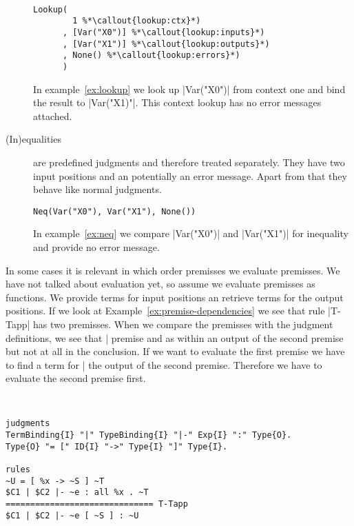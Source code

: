 \begin{description}
\begin{example}{~}
\begin{lstlisting}[language=sltc]
Lookup(
        1 %*\callout{lookup:ctx}*)
      , [Var("X0")] %*\callout{lookup:inputs}*)
      , [Var("X1")] %*\callout{lookup:outputs}*)
      , None() %*\callout{lookup:errors}*)
      )
\end{lstlisting}
\label{ex:lookup}
\end{example}

  In example~\ref{ex:lookup} we look up \code|Var("X0")| from
  context one and bind the result to \code|Var("X1)"|. This context
  lookup has no error messages attached.

\item[(In)equalities] are predefined judgments and therefore treated
  separately. They have two input positions and an potentially an
  error message. Apart from that they behave like normal judgments.

\begin{example}
\begin{lstlisting}[language=sltc]
Neq(Var("X0"), Var("X1"), None())
\end{lstlisting}
\label{ex:neq}
\end{example}

  In example~\ref{ex:neq} we compare \code|Var("X0")| and
  \code|Var("X1")| for inequality and provide no error message.
\end{description}

In some cases it is relevant in which order premisses we evaluate
premisses. We have not talked about evaluation yet, so assume we
evaluate premisses as functions. We provide terms for input positions
an retrieve terms for the output positions. If we look at
Example~\ref{ex:premise-dependencies} we see that rule \code|T-Tapp|
has two premisses. When we compare the premisses with the judgment
definitions, we see that \code|%
premise and as within an output of the second premise but not at all
in the conclusion. If we want to evaluate the first premise we
have to find a term for \code|%
the output of the second premise. Therefore we have to evaluate the
second premise first.

\begin{example}{~}
\begin{lstlisting}[language=sltc]
judgments
TermBinding{I} "|" TypeBinding{I} "|-" Exp{I} ":" Type{O}.
Type{O} "= [" ID{I} "->" Type{I} "]" Type{I}.

rules
~U = [ %x -> ~S ] ~T
$C1 | $C2 |- ~e : all %x . ~T 
============================== T-Tapp
$C1 | $C2 |- ~e [ ~S ] : ~U
\end{lstlisting}
\label{ex:premise-dependencies}
\end{example}

